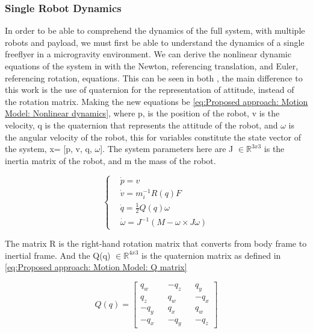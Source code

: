 \subsubsection{Single Robot Dynamics}
In order to be able to comprehend the dynamics of the full system, with multiple robots and payload, we must first be able to understand the dynamics of a single freeflyer in a microgravity environment. We can derive the nonlinear dynamic equations of the system in with the Newton, referencing translation, and Euler, referencing rotation, equations. This can be seen in both \cite{RoqueVentura2016spacecobot}, the main difference to this work is the use of quaternion for the representation of attitude, instead of the rotation matrix. Making the new equations be \ref{eq:Proposed approach: Motion Model: Nonlinear dynamics}, where p, is the position of the robot, v is the velocity, q is the quaternion that represents the attitude of the robot, and $\omega$ is the angular velocity of the robot, this for variables constitute the state vector of the system, x= [p, v, q, $\omega$]. The system parameters here are J $\in \mathbb{R}^{3x3}$ is the inertia matrix of the robot, and m the mass of the robot.

\begin{equation}
    \begin{cases}
        &\dot{p} = v \\
        &\dot{v} =m_i^{-1} R(q)F \\
        &\dot{q} = \frac{1}{2}Q(q) \omega \\ 
        &\dot{\omega} = J^{-1} \left(M -\omega \times J\omega \right) 
    \end{cases}
    \label{eq:Proposed approach: Motion Model: Nonlinear dynamics}
\end{equation}

The matrix R is the right-hand rotation matrix that converts from body frame to inertial frame. And the Q(q) $\in \mathbb{R}^{4x3}$ is the quaternion matrix as defined in \ref{eq:Proposed approach: Motion Model: Q matrix}

\begin{equation}
    Q\left(q\right) = 
    \begin{bmatrix}
        q_w && -q_z && q_y \\
        q_z && q_w && -q_x \\
        -q_y && q_x && q_w \\
        -q_x && -q_y && -q_z
    \end{bmatrix}
    \label{eq:Proposed approach: Motion Model: Q matrix}
\end{equation}

